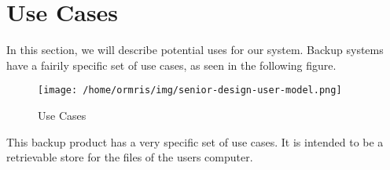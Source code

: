 \section{Use Cases}
In this section, we will describe potential uses for our system. Backup systems have a fairily specific set of use cases, as seen in the following figure.

\begin{figure}[h]
\centering\texttt{[image: /home/ormris/img/senior-design-user-model.png]}
\caption{Use Cases}
\end{figure}

This backup product has a very specific set of use cases. It is intended to be a retrievable store for the files of the users computer.
